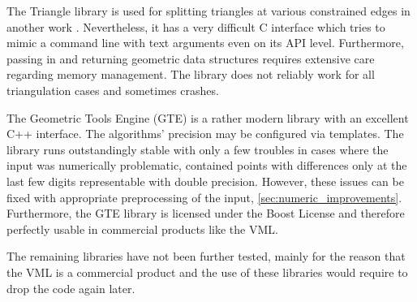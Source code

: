 The Triangle library is used for splitting triangles at various constrained edges in another work \cite{mesh_intersection}.
Nevertheless, it has a very difficult C interface which tries to mimic a command line with text arguments even on its API level.
Furthermore, passing in and returning geometric data structures requires extensive care regarding memory management.
The library does not reliably work for all triangulation cases and sometimes crashes.

The Geometric Tools Engine (GTE) is a rather modern library with an excellent C++ interface.
The algorithms' precision may be configured via templates.
The library runs outstandingly stable with only a few troubles in cases where the input was numerically problematic, \eg contained points with differences only at the last few digits representable with double precision.
However, these issues can be fixed with appropriate preprocessing of the input, \cf \cref{sec:numeric_improvements}.
Furthermore, the GTE library is licensed under the Boost License and therefore perfectly usable in commercial products like the VML.

The remaining libraries have not been further tested, mainly for the reason that the VML is a commercial product and the use of these libraries would require to drop the code again later.

